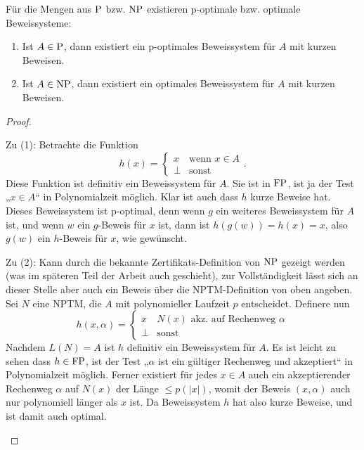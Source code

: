 Für die Mengen aus $\P$ bzw. $\NP$ existieren p-optimale bzw. optimale Beweissysteme:
\begin{observation}
    \begin{enumerate}
        \item Ist $A\in \P$, dann existiert ein p-optimales Beweissystem für $A$ mit kurzen Beweisen.
        \item Ist $A\in \NP$, dann existiert ein optimales Beweissystem für $A$ mit kurzen Beweisen.
    \end{enumerate}
\end{observation}
\begin{proof}
\begin{prooflist}
\item Zu (1): Betrachte die Funktion
    \[ h(x) = \begin{cases} x & \text{wenn $x\in A$} \\ \bot & \text{sonst} \end{cases}. \]
    Diese Funktion ist definitiv ein Beweissystem für $A$. Sie ist in $\FP$, ist ja der Test „$x\in A$“ in Polynomialzeit möglich. Klar ist auch dass $h$ kurze Beweise hat. Dieses Beweissystem ist p-optimal, denn wenn $g$ ein weiteres Beweissystem für $A$ ist, und wenn $w$ ein $g$-Beweis für $x$ ist, dann ist $h(g(w))=h(x)=x$, also $g(w)$ ein $h$-Beweis für $x$, wie gewünscht. 

\item Zu (2): Kann durch die bekannte Zertifikats-Definition von $\NP$ gezeigt werden (was im späteren Teil der Arbeit auch geschieht), zur Vollständigkeit lässt sich an dieser Stelle aber auch ein Beweis über die NPTM-Definition von oben angeben. Sei $N$ eine NPTM, die $A$ mit polynomieller Laufzeit $p$ entscheidet.
    Definere nun
    \[ h(x, \alpha) = \begin{cases} x & \text{$N(x)$ akz. auf Rechenweg $\alpha$} \\ \bot & \text{sonst} \end{cases} \]
    Nachdem $L(N)=A$ ist $h$ definitiv ein Beweissystem für $A$. Es ist leicht zu sehen dass $h\in\FP$, ist der Test „$\alpha$ ist ein gültiger Rechenweg und akzeptiert“ in Polynomialzeit möglich. Ferner existiert für jedes $x\in A$ auch ein akzeptierender Rechenweg $\alpha$ auf $N(x)$ der Länge $\leq p(|x|)$, womit der Beweis $(x, \alpha)$ auch nur polynomiell länger als $x$ ist. Da Beweissystem $h$ hat also kurze Beweise, und ist damit auch optimal.
\end{prooflist}
\end{proof}
